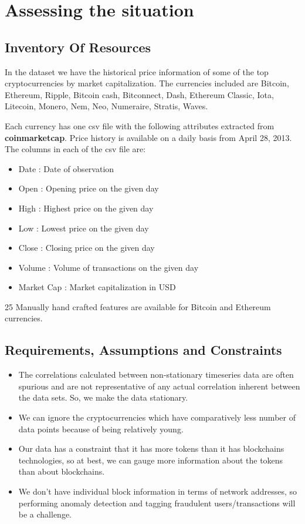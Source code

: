 \documentclass{article}
\begin{document}
\section{Assessing the situation}
\subsection{Inventory Of Resources}
In the dataset we have the historical price information of some of the top cryptocurrencies by market capitalization. The currencies included are Bitcoin,
Ethereum, Ripple, Bitcoin cash, Bitconnect, Dash, Ethereum Classic, Iota, Litecoin, Monero, Nem, Neo, Numeraire, Stratis, Waves.


Each currency has one csv file with the following attributes extracted from \textbf{coinmarketcap}. Price history is available on a daily basis from April 28, 2013. The columns in each of the csv file are:
\begin{itemize}
\item Date : Date of observation
\item Open : Opening price on the given day
\item High : Highest price on the given day
\item Low : Lowest price on the given day
\item Close : Closing price on the given day
\item Volume : Volume of transactions on the given day
\item Market Cap : Market capitalization in USD
\end{itemize}
25 Manually hand crafted features are available for Bitcoin and Ethereum currencies.

\subsection{Requirements, Assumptions and Constraints}
\begin{itemize}
    \item The correlations calculated between non-stationary timeseries data are often spurious and are not representative of any actual correlation inherent between the data sets. So, we make the data stationary.
    \item We can ignore the cryptocurrencies which have comparatively less number of data points because of being relatively young.
    \item Our data has a constraint that it has more tokens than it has blockchains technologies, so at best, we can gauge more information about the tokens than about blockchains.
    \item We don't have individual block information in terms of network addresses, so performing anomaly detection and tagging fraudulent users/transactions will be a challenge.
\end{itemize}
\end{document}

